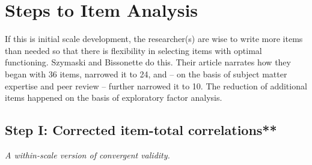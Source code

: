 \documentclass[
  english,
]{book}
\begin{document}
\hypertarget{steps-to-item-analysis}{%
\section{Steps to Item Analysis}\label{steps-to-item-analysis}}

If this is initial scale development, the researcher(s) are wise to write more items than needed so that there is flexibility in selecting items with optimal functioning. Szymaski and Bissonette \citeyearpar{szymanski_perceptions_2020} do this. Their article narrates how they began with 36 items, narrowed it to 24, and -- on the basis of subject matter expertise and peer review -- further narrowed it to 10. The reduction of additional items happened on the basis of exploratory factor analysis.

\hypertarget{step-i-corrected-item-total-correlations}{%
\subsection{Step I: Corrected item-total correlations**}\label{step-i-corrected-item-total-correlations}}

\emph{A within-scale version of convergent validity.}
\end{document}
